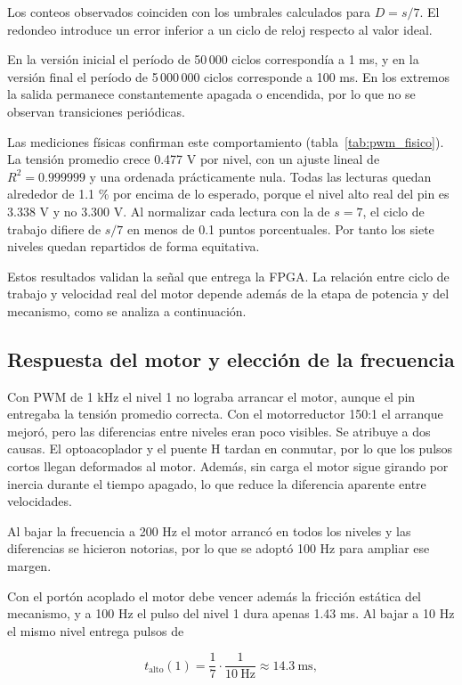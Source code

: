 \documentclass[12pt,letterpaper]{article}
\begin{document}
Los conteos observados coinciden con los umbrales
calculados para $D=s/7$. El redondeo introduce un error
inferior a un ciclo de reloj respecto al valor ideal.

En la versión inicial el período de 50\,000 ciclos
correspondía a 1 ms, y en la versión final el período
de 5\,000\,000 ciclos corresponde a 100 ms. En los extremos
la salida permanece constantemente apagada o encendida,
por lo que no se observan transiciones periódicas.

Las mediciones físicas confirman este comportamiento
(tabla~\ref{tab:pwm_fisico}). La tensión promedio crece
0.477 V por nivel, con un ajuste lineal de
$R^2 = 0.999999$ y una ordenada prácticamente nula. Todas
las lecturas quedan alrededor de 1.1 \% por encima de lo
esperado, porque el nivel alto real del pin es 3.338 V y
no 3.300 V. Al normalizar cada lectura con la de $s=7$,
el ciclo de trabajo difiere de $s/7$ en menos de 0.1
puntos porcentuales. Por tanto los siete niveles quedan
repartidos de forma equitativa.

Estos resultados validan la señal que entrega la FPGA.
La relación entre ciclo de trabajo y velocidad real del
motor depende además de la etapa de potencia y del
mecanismo, como se analiza a continuación.

\subsection{Respuesta del motor y elección de la frecuencia}
\label{sec:motor}

Con PWM de 1 kHz el nivel 1 no lograba arrancar el motor,
aunque el pin entregaba la tensión promedio correcta. Con
el motorreductor 150:1 el arranque mejoró, pero las
diferencias entre niveles eran poco visibles. Se atribuye
a dos causas. El optoacoplador y el puente H tardan en
conmutar, por lo que los pulsos cortos llegan deformados
al motor. Además, sin carga el motor sigue girando por
inercia durante el tiempo apagado, lo que reduce la
diferencia aparente entre velocidades.

Al bajar la frecuencia a 200 Hz el motor arrancó en todos
los niveles y las diferencias se hicieron notorias, por lo
que se adoptó 100 Hz para ampliar ese margen.

Con el portón acoplado el motor debe vencer además la
fricción estática del mecanismo, y a 100 Hz el pulso del
nivel 1 dura apenas 1.43 ms. Al bajar a 10 Hz el mismo
nivel entrega pulsos de

\begin{equation}
t_{\mathrm{alto}}(1)=\frac{1}{7}\cdot\frac{1}{10\ \mathrm{Hz}}
\approx 14.3\ \mathrm{ms},
\end{equation}
\end{document}
